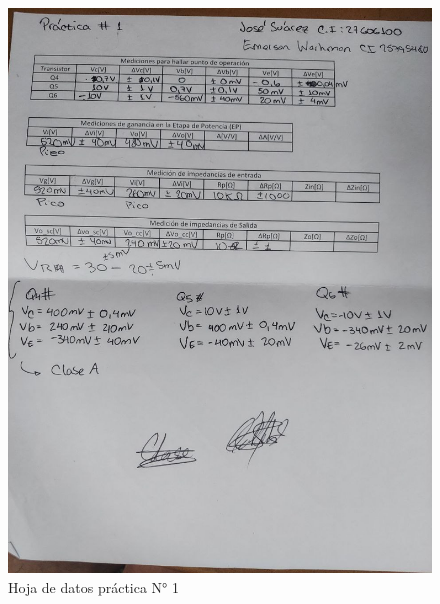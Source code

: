 
\begin{figure}[ht]
    \centering
    \includegraphics[width=1.0\textwidth]{src/images/p1/p1-hoja-de-datos.jpg}
    \caption{Hoja de datos práctica N° 1}
    \label{fig:hoja-de-datos-p1}
\end{figure}

